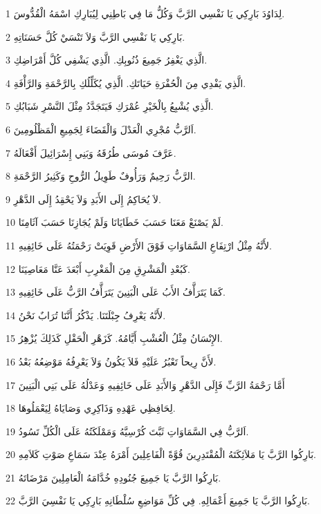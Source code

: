 \par 1 لِدَاوُدَ بَارِكِي يَا نَفْسِي الرَّبَّ وَكُلُّ مَا فِي بَاطِنِي لِيُبَارِكِ اسْمَهُ الْقُدُّوسَ.
\par 2 بَارِكِي يَا نَفْسِي الرَّبَّ وَلاَ تَنْسَيْ كُلَّ حَسَنَاتِهِ.
\par 3 الَّذِي يَغْفِرُ جَمِيعَ ذُنُوبِكِ. الَّذِي يَشْفِي كُلَّ أَمْرَاضِكِ.
\par 4 الَّذِي يَفْدِي مِنَ الْحُفْرَةِ حَيَاتَكِ. الَّذِي يُكَلِّلُكِ بِالرَّحْمَةِ وَالرَّأْفَةِ.
\par 5 الَّذِي يُشْبِعُ بِالْخَيْرِ عُمْرَكِ فَيَتَجَدَّدُ مِثْلَ النَّسْرِ شَبَابُكِ.
\par 6 اَلرَّبُّ مُجْرِي الْعَدْلَ وَالْقَضَاءَ لِجَمِيعِ الْمَظْلُومِينَ.
\par 7 عَرَّفَ مُوسَى طُرُقَهُ وَبَنِي إِسْرَائِيلَ أَفْعَالَهُ.
\par 8 الرَّبُّ رَحِيمٌ وَرَأُوفٌ طَوِيلُ الرُّوحِ وَكَثِيرُ الرَّحْمَةِ.
\par 9 لاَ يُحَاكِمُ إِلَى الأَبَدِ وَلاَ يَحْقِدُ إِلَى الدَّهْرِ.
\par 10 لَمْ يَصْنَعْ مَعَنَا حَسَبَ خَطَايَانَا وَلَمْ يُجَازِنَا حَسَبَ آثَامِنَا.
\par 11 لأَنَّهُ مِثْلُ ارْتِفَاعِ السَّمَاوَاتِ فَوْقَ الأَرْضِ قَوِيَتْ رَحْمَتُهُ عَلَى خَائِفِيهِ.
\par 12 كَبُعْدِ الْمَشْرِقِ مِنَ الْمَغْرِبِ أَبْعَدَ عَنَّا مَعَاصِيَنَا.
\par 13 كَمَا يَتَرَأَّفُ الأَبُ عَلَى الْبَنِينَ يَتَرَأَّفُ الرَّبُّ عَلَى خَائِفِيهِ.
\par 14 لأَنَّهُ يَعْرِفُ جِبْلَتَنَا. يَذْكُرُ أَنَّنَا تُرَابٌ نَحْنُ.
\par 15 الإِنْسَانُ مِثْلُ الْعُشْبِ أَيَّامُهُ. كَزَهْرِ الْحَقْلِ كَذَلِكَ يُزْهِرُ.
\par 16 لأَنَّ رِيحاً تَعْبُرُ عَلَيْهِ فَلاَ يَكُونُ وَلاَ يَعْرِفُهُ مَوْضِعُهُ بَعْدُ.
\par 17 أَمَّا رَحْمَةُ الرَّبِّ فَإِلَى الدَّهْرِ وَالأَبَدِ عَلَى خَائِفِيهِ وَعَدْلُهُ عَلَى بَنِي الْبَنِينَ
\par 18 لِحَافِظِي عَهْدِهِ وَذَاكِرِي وَصَايَاهُ لِيَعْمَلُوهَا.
\par 19 اَلرَّبُّ فِي السَّمَاوَاتِ ثَبَّتَ كُرْسِيَّهُ وَمَمْلَكَتُهُ عَلَى الْكُلِّ تَسُودُ.
\par 20 بَارِكُوا الرَّبَّ يَا مَلاَئِكَتَهُ الْمُقْتَدِرِينَ قُوَّةً الْفَاعِلِينَ أَمْرَهُ عِنْدَ سَمَاعِ صَوْتِ كَلاَمِهِ.
\par 21 بَارِكُوا الرَّبَّ يَا جَمِيعَ جُنُودِهِ خُدَّامَهُ الْعَامِلِينَ مَرْضَاتَهُ.
\par 22 بَارِكُوا الرَّبَّ يَا جَمِيعَ أَعْمَالِهِ. فِي كُلِّ مَوَاضِعِ سُلْطَانِهِ بَارِكِي يَا نَفْسِيَ الرَّبَّ.

